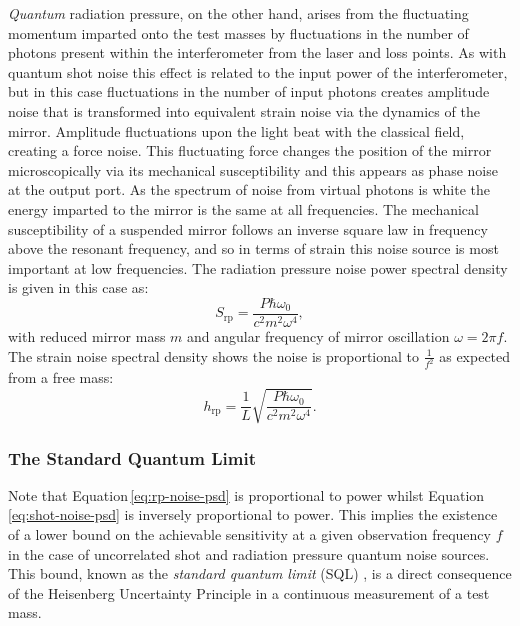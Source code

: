 \emph{Quantum} radiation pressure, on the other hand, arises from the fluctuating momentum imparted onto the test masses by fluctuations in the number of photons present within the interferometer from the laser and loss points. As with quantum shot noise this effect is related to the input power of the interferometer, but in this case fluctuations in the number of input photons creates amplitude noise that is transformed into equivalent strain noise via the dynamics of the mirror. Amplitude fluctuations upon the light beat with the classical field, creating a force noise. This fluctuating force changes the position of the mirror microscopically via its mechanical susceptibility and this appears as phase noise at the output port. As the spectrum of noise from virtual photons is white the energy imparted to the mirror is the same at all frequencies. The mechanical susceptibility of a suspended mirror follows an inverse square law in frequency above the resonant frequency, and so in terms of strain this noise source is most important at low frequencies. The radiation pressure noise power spectral density is given in this case as:
\begin{equation}
  \label{eq:rp-noise-psd}
  S_{\text{rp}} = \frac{P \hbar \omega_0}{c^2 m^2 \omega^4},
\end{equation}
with reduced mirror mass $m$ and angular frequency of mirror oscillation $\omega = 2 \pi f$. The strain noise spectral density shows the noise is proportional to $\frac{1}{f^2}$ as expected from a free mass:
\begin{equation}
  h_{\text{rp}} = \frac{1}{L} \sqrt{\frac{P \hbar \omega_0}{c^2 m^2 \omega^4}}.
\end{equation}

\subsubsection{\label{sec:sql}The Standard Quantum Limit}
Note that Equation\,\ref{eq:rp-noise-psd} is proportional to power whilst Equation\,\ref{eq:shot-noise-psd} is inversely proportional to power. This implies the existence of a lower bound on the achievable sensitivity at a given observation frequency $f$ in the case of uncorrelated shot and radiation pressure quantum noise sources. This bound, known as the \emph{standard quantum limit} (\gls{SQL}) \cite{Braginsky1967}, is a direct consequence of the Heisenberg Uncertainty Principle in a continuous measurement of a test mass.

